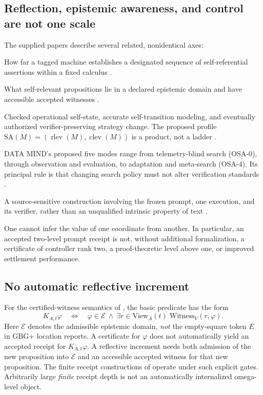 \documentclass[11pt,letterpaper]{article}
\newcommand{\View}{\mathrm{View}}
\newcommand{\Witness}{\mathrm{Witness}}
\begin{document}
\subsection{Reflection, epistemic awareness, and control are not one scale}
The supplied papers describe several related, nonidentical axes:
\begin{description}[style=nextline,leftmargin=1.0cm,labelindent=0cm]
\item[Proof-theoretic reflection $\operatorname{lev}(M)$] How far a tagged machine establishes a designated sequence of self-referential assertions within a fixed calculus \cite{firstdegrees}.
\item[Verifier-grounded awareness $\operatorname{aw}(A,t)$] What self-relevant propositions lie in a declared epistemic domain and have accessible accepted witnesses \cite{reflective,firstdegrees}.
\item[Controller rank $\operatorname{clev}(M)$] Checked operational self-state, accurate self-transition modeling, and eventually authorized verifier-preserving strategy change. The proposed profile $\mathrm{SA}(M)=(\operatorname{rlev}(M),\operatorname{clev}(M))$ is a product, not a ladder \cite{notladder}.
\item[Operational self-awareness modes (OSA)] DATA MIND's proposed five modes range from telemetry-blind search (OSA-0), through observation and evaluation, to adaptation and meta-search (OSA-4). Its principal rule is that changing search policy must not alter verification standards \cite{osa}.
\item[Prompt-relative VGPSA] A source-sensitive construction involving the frozen prompt, one execution, and its verifier, rather than an unqualified intrinsic property of text \cite{vgpsa}.
\end{description}
One cannot infer the value of one coordinate from another. In particular, an accepted two-level prompt receipt is not, without additional formalization, a certificate of controller rank two, a proof-theoretic level above one, or improved settlement performance.

\subsection{No automatic reflective increment}
For the certified-witness semantics of \cite{reflective}, the basic predicate has the form
\begin{equation}\label{eq:knowledge}
K_{A,t}\varphi\quad\Longleftrightarrow\quad
\varphi\in\mathcal E\ \wedge\ \exists r\in\View_A(t)\;\Witness_V(r,\varphi).
\end{equation}
Here $\mathcal E$ denotes the admissible epistemic domain, \emph{not} the empty-square token $E$ in GBG+ location reports. A certificate for $\varphi$ does not automatically yield an accepted receipt for $K_{A,t}\varphi$. A reflective increment needs both admission of the new proposition into $\mathcal E$ and an accessible accepted witness for that new proposition. The finite receipt constructions of \cite{reflective} operate under such explicit gates. Arbitrarily large \emph{finite} receipt depth is not an automatically internalized omega-level object.
\end{document}
